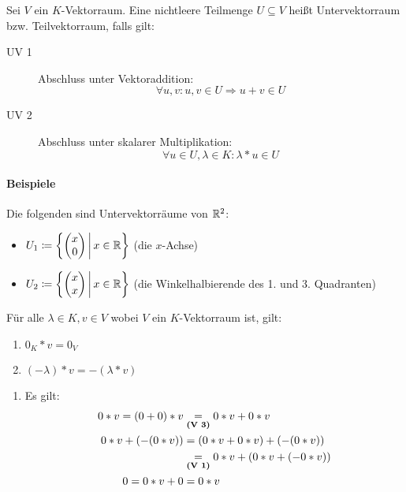 Sei $V$ ein $K$-Vektorraum. Eine nichtleere Teilmenge $U\subseteq V$ heißt Untervektorraum bzw. Teilvektorraum, falls gilt:
\begin{description}
  \item[UV 1] Abschluss unter Vektoraddition:
  \begin{equation*}
    \forall u,v : u,v \in U \Rightarrow u+v\in U
  \end{equation*}
  \item[UV 2] Abschluss unter skalarer Multiplikation:
  \begin{equation*}
    \forall u\in U, \lambda\in K : \lambda* u \in U
  \end{equation*}
\end{description}

\paragraph{Beispiele}
Die folgenden sind Untervektorräume von $\mathbb{R}^2$:
\begin{itemize}
  \item $U_1\coloneqq \left\{ \begin{pmatrix}x\\0\end{pmatrix} \,\middle|\, x\in\mathbb{R} \right\}$ (die $x$-Achse)
  \item $U_2\coloneqq \left\{ \begin{pmatrix}x\\x\end{pmatrix} \,\middle|\, x\in\mathbb{R} \right\}$ (die Winkelhalbierende des 1. und 3. Quadranten)
\end{itemize}


\lemma{}
Für alle $\lambda \in K, v\in V$ wobei $V$ ein $K$-Vektorraum ist, gilt:
\begin{enumerate}
  \item $0_K* v = 0_V$
  \item $(-\lambda)* v = -(\lambda* v)$
\end{enumerate}
\beweis
\begin{enumerate}
  \item Es gilt:
  \begin{align*}
    0* v = (0+0)* v &\underset{\text{\textbf{(V 3)}}}{=}0* v+ 0* v\\
    0* v + (-(0* v)) &=(0* v + 0* v)+(-(0*v))\\
    &\underset{\text{\textbf{(V 1)}}}{=} 0*v+(0*v+(-0*v))\\
    0=0*v +0&=0*v
  \end{align*}
\end{enumerate}


